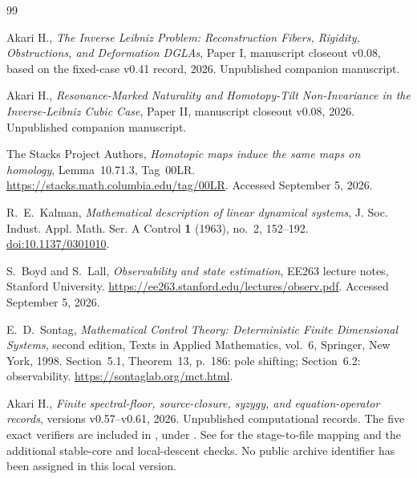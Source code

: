 \documentclass[11pt]{amsart}
\theoremstyle{definition}
\begin{document}
\begin{thebibliography}{99}
\raggedright

Akari H.,
\emph{The Inverse Leibniz Problem: Reconstruction Fibers, Rigidity, Obstructions, and Deformation DGLAs},
Paper I, manuscript closeout v0.08, based on the fixed-case v0.41 record, 2026.
Unpublished companion manuscript.

Akari H.,
\emph{Resonance-Marked Naturality and Homotopy-Tilt Non-Invariance in the Inverse-Leibniz Cubic Case},
Paper II, manuscript closeout v0.08, 2026. Unpublished companion manuscript.


The Stacks Project Authors,
\emph{Homotopic maps induce the same maps on homology},
Lemma~10.71.3, Tag~00LR.
\url{https://stacks.math.columbia.edu/tag/00LR}. Accessed September 5, 2026.

R.~E.~Kalman,
\emph{Mathematical description of linear dynamical systems},
J. Soc. Indust. Appl. Math. Ser. A Control \textbf{1} (1963), no.~2, 152--192.
\href{https://doi.org/10.1137/0301010}{doi:10.1137/0301010}.

S.~Boyd and S.~Lall,
\emph{Observability and state estimation},
EE263 lecture notes, Stanford University.
\url{https://ee263.stanford.edu/lectures/observ.pdf}. Accessed September 5, 2026.

E.~D.~Sontag,
\emph{Mathematical Control Theory: Deterministic Finite Dimensional Systems},
second edition, Texts in Applied Mathematics, vol.~6, Springer, New York, 1998.
Section~5.1, Theorem~13, p.~186: pole shifting; Section~6.2: observability.
\url{https://sontaglab.org/mct.html}.

Akari H.,
\emph{Finite spectral-floor, source-closure, syzygy, and equation-operator records},
versions v0.57--v0.61, 2026. Unpublished computational records.
The five exact verifiers are included in
, under
.
See  for the stage-to-file mapping and the
additional stable-core and local-descent checks. No public archive
identifier has been assigned in this local version.
\end{thebibliography}
\end{document}
